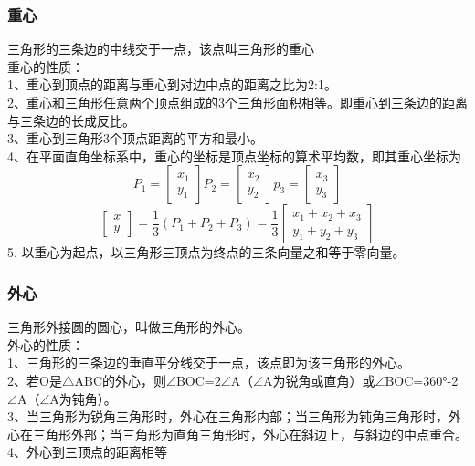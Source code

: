 \documentclass[UTF8]{ctexart}
\begin{document}
			\subsubsection{重心}
				三角形的三条边的中线交于一点，该点叫三角形的重心\\
				重心的性质：\\
				1、重心到顶点的距离与重心到对边中点的距离之比为2:1。\\
				2、重心和三角形任意两个顶点组成的3个三角形面积相等。即重心到三条边的距离与三条边的长成反比。\\
				3、重心到三角形3个顶点距离的平方和最小。\\
				4、在平面直角坐标系中，重心的坐标是顶点坐标的算术平均数，即其重心坐标为
				\[P_1=
					\begin{bmatrix}
						x_1\\
						y_1
					\end{bmatrix}
				  P_2=
					\begin{bmatrix}
						x_2\\
						y_2
					\end{bmatrix}
				  p_3=
					\begin{bmatrix}
						x_3\\
						y_3
					\end{bmatrix}
				\]
				\[
					\begin{bmatrix}
						x\\
						y
					\end{bmatrix}
					=\frac{1}{3}(P_1+P_2+P_3)=\frac{1}{3}
					\begin{bmatrix}
						x_1+x_2+x_3\\
						y_1+y_2+y_3
					\end{bmatrix}
				\]
				5. 以重心为起点，以三角形三顶点为终点的三条向量之和等于零向量。
			\subsubsection{外心}
				三角形外接圆的圆心，叫做三角形的外心。\\
				外心的性质：\\
				1、三角形的三条边的垂直平分线交于一点，该点即为该三角形的外心。\\
				2、若O是$\bigtriangleup$ABC的外心，则$\angle$BOC=2$\angle$A（$\angle$A为锐角或直角）或$\angle$BOC=360°-2$\angle$A（$\angle$A为钝角）。\\
				3、当三角形为锐角三角形时，外心在三角形内部；当三角形为钝角三角形时，外心在三角形外部；当三角形为直角三角形时，外心在斜边上，与斜边的中点重合。\\
				4、外心到三顶点的距离相等
\end{document}
